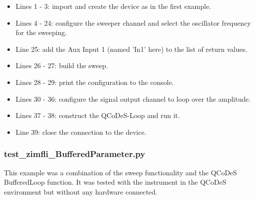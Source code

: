\documentclass[11pt]{article} %
\begin{document}
\begin{itemize}[]
\itemsep0pt
\item Lines 1 - 3: import and create the device as in the first example.
\item Lines 4 - 24: configure the sweeper channel and select the oscillator frequency for the sweeping.
\item Line 25: add the Aux Input 1 (named 'In1' here) to the list of return values.
\item Lines 26 - 27: build the sweep.
\item Lines 28 - 29: print the configuration to the console.
\item Lines 30 - 36: configure the signal output channel to loop over the amplitude.
\item Lines 37 - 38: construct the QCoDeS-Loop and run it.
\item Line 39: close the connection to the device.
\end{itemize}



\subsubsection{test\_zimfli\_BufferedParameter.py}
This example was a combination of the sweep functionality and the QCoDeS BufferedLoop function. It was tested with the instrument in the QCoDeS environment but without any hardware connected.
\end{document}
